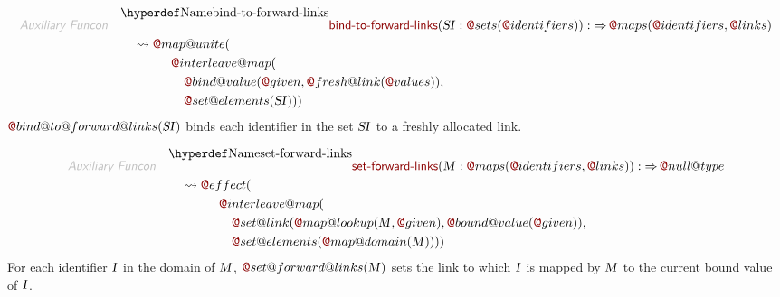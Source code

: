 \begin{align*}
  \KEY{Auxiliary Funcon} \quad
  & \FUNDEC{bind-to-forward-links}(
                     \VAR{SI} : \FUN@sets
                               (  \FUN@identifiers )) 
    :  \TO \FUN@maps
                     (  \FUN@identifiers, 
                            \FUN@links ) \\&\quad
    \leadsto \FUN@map@unite
               ( \\&\quad\quad\quad\quad \FUN@interleave@map
                       ( \\&\quad\quad\quad\quad\quad \FUN@bind@value
                               (  \FUN@given, 
                                      \FUN@fresh@link
                                       (  \FUN@values ) ), \\&\quad\quad\quad\quad\quad
                              \FUN@set@elements
                               (  \VAR{SI} ) ) )
\end{align*}
$\FUN@bind@to@forward@links
    (  \VAR{SI} )$ binds each identifier in the set $\VAR{SI}$ to a
  freshly allocated link.

\begin{align*}
  \KEY{Auxiliary Funcon} \quad
  & \FUNDEC{set-forward-links}(
                     \VAR{M} : \FUN@maps
                               (  \FUN@identifiers, 
                                      \FUN@links )) 
    :  \TO \FUN@null@type \\&\quad
    \leadsto \FUN@effect
               ( \\&\quad\quad\quad\quad \FUN@interleave@map
                       ( \\&\quad\quad\quad\quad\quad \FUN@set@link
                               (  \FUN@map@lookup
                                       (  \VAR{M}, 
                                              \FUN@given ), 
                                      \FUN@bound@value
                                       (  \FUN@given ) ), \\&\quad\quad\quad\quad\quad
                              \FUN@set@elements
                               (  \FUN@map@domain
                                       (  \VAR{M} ) ) ) )
\end{align*}
For each identifier $\VAR{I}$ in the domain of $\VAR{M}$, $\FUN@set@forward@links
    (  \VAR{M} )$ sets the 
  link to which $\VAR{I}$ is mapped by $\VAR{M}$ to the current bound value of $\VAR{I}$.



